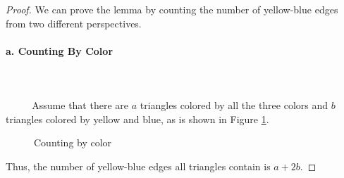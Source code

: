 \documentclass[oneside,solution]{seu-ml-assign}
\begin{document}
\begin{proof}
We can prove the lemma by counting the number of yellow-blue edges from
two different perspectives.

\paragraph{a. Counting By Color} 
\\ \hspace*{\fill} \\
$\text{        }\quad\text{  }$
Assume that there are \(a\) triangles colored
by all the three colors and \(b\) triangles colored by yellow and blue,
as is shown in Figure \ref{fig:1}.
\begin{figure}[H]
  \centering
  \hspace{0.5in} %
  \caption{Counting by color}
  \label{fig:1} 
\end{figure}


Thus, the number of yellow-blue edges all triangles contain is \(a+2b\).


\end{proof}
\end{document}

